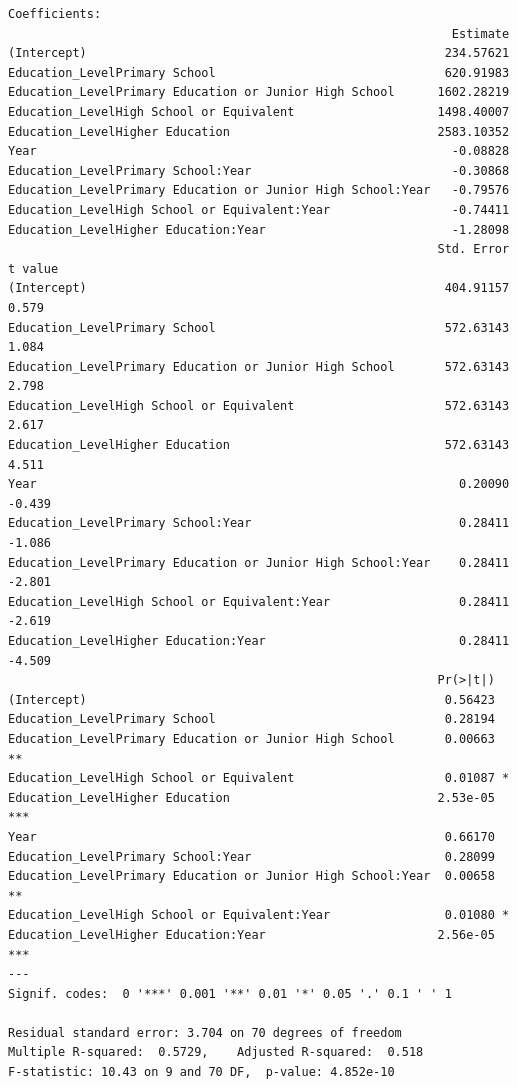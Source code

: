 \documentclass[
  11pt,
  a4paper,
  DIV=11,
  numbers=noendperiod]{scrartcl}
\begin{document}
\begin{verbatim}
Coefficients:
                                                              Estimate
(Intercept)                                                  234.57621
Education_LevelPrimary School                                620.91983
Education_LevelPrimary Education or Junior High School      1602.28219
Education_LevelHigh School or Equivalent                    1498.40007
Education_LevelHigher Education                             2583.10352
Year                                                          -0.08828
Education_LevelPrimary School:Year                            -0.30868
Education_LevelPrimary Education or Junior High School:Year   -0.79576
Education_LevelHigh School or Equivalent:Year                 -0.74411
Education_LevelHigher Education:Year                          -1.28098
                                                            Std. Error t value
(Intercept)                                                  404.91157   0.579
Education_LevelPrimary School                                572.63143   1.084
Education_LevelPrimary Education or Junior High School       572.63143   2.798
Education_LevelHigh School or Equivalent                     572.63143   2.617
Education_LevelHigher Education                              572.63143   4.511
Year                                                           0.20090  -0.439
Education_LevelPrimary School:Year                             0.28411  -1.086
Education_LevelPrimary Education or Junior High School:Year    0.28411  -2.801
Education_LevelHigh School or Equivalent:Year                  0.28411  -2.619
Education_LevelHigher Education:Year                           0.28411  -4.509
                                                            Pr(>|t|)    
(Intercept)                                                  0.56423    
Education_LevelPrimary School                                0.28194    
Education_LevelPrimary Education or Junior High School       0.00663 ** 
Education_LevelHigh School or Equivalent                     0.01087 *  
Education_LevelHigher Education                             2.53e-05 ***
Year                                                         0.66170    
Education_LevelPrimary School:Year                           0.28099    
Education_LevelPrimary Education or Junior High School:Year  0.00658 ** 
Education_LevelHigh School or Equivalent:Year                0.01080 *  
Education_LevelHigher Education:Year                        2.56e-05 ***
---
Signif. codes:  0 '***' 0.001 '**' 0.01 '*' 0.05 '.' 0.1 ' ' 1

Residual standard error: 3.704 on 70 degrees of freedom
Multiple R-squared:  0.5729,    Adjusted R-squared:  0.518 
F-statistic: 10.43 on 9 and 70 DF,  p-value: 4.852e-10
\end{verbatim}
\end{document}
